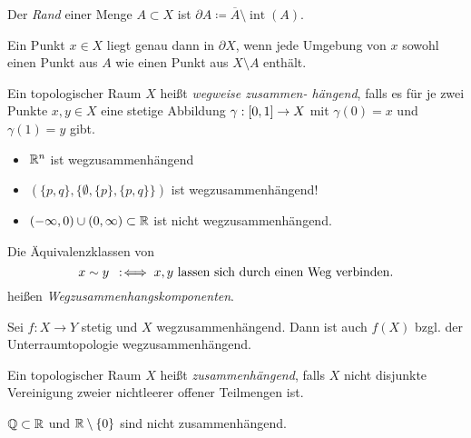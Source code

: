 \documentclass{cheat-sheet}
\newcommand{\inte}{\mathop{\mathrm{int}}} %
\begin{document}
\begin{defn}
  Der \emph{Rand} einer Menge $A \subset X$ ist $\partial A \coloneqq \overline{A} \setminus \inte(A)$.
\end{defn}

\begin{prop}
  Ein Punkt $x \in X$ liegt genau dann in $\partial X$, wenn jede Umgebung von $x$ sowohl einen Punkt aus $A$ wie einen Punkt aus $X \setminus A$ enthält.
\end{prop}



\begin{defn}
  Ein topologischer Raum $X$ heißt \emph{wegweise zusammen- hängend}, falls es für je zwei Punkte $x, y \in X$ eine stetige Abbildung $\gamma : \left[ 0, 1 \right] \to X$ mit $\gamma(0) = x$ und $\gamma(1) = y$ gibt.
\end{defn}

\begin{bspe}
  \begin{itemize}
    \item $\mathbb{R}^n$ ist wegzusammenhängend
    \item $(\{ p, q \}, \{ \emptyset, \{ p \}, \{ p, q \} \})$ ist wegzusammenhängend!
    \item $\left( -\infty, 0 \right) \cup \left( 0, \infty \right) \subset \mathbb{R}$ ist nicht wegzusammenhängend.
  \end{itemize}
\end{bspe}

\begin{defn}
  Die Äquivalenzklassen von
  \[ x \sim y \enspace:\!\iff x, y \text{ lassen sich durch einen Weg verbinden}. \]
  heißen \emph{Wegzusammenhangskomponenten}.
\end{defn}

\begin{prop}
  Sei $f : X \to Y$ stetig und $X$ wegzusammenhängend. Dann ist auch $f(X)$ bzgl. der Unterraumtopologie wegzusammenhängend.
\end{prop}

\begin{defn}
  Ein topologischer Raum $X$ heißt \emph{zusammenhängend}, falls $X$ nicht disjunkte Vereinigung zweier nichtleerer offener Teilmengen ist.
\end{defn}

\begin{bspe}
  $\mathbb{Q} \subset \mathbb{R}$ und $\mathbb{R} \setminus \{ 0 \}$ sind nicht zusammenhängend.
\end{bspe}
\end{document}
